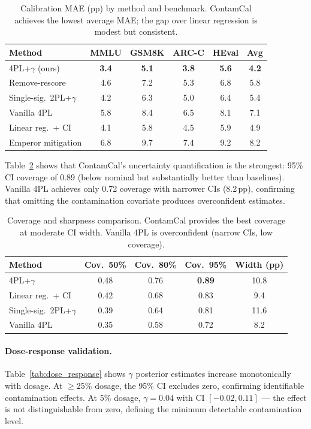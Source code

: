 \documentclass[letterpaper,11pt]{article}
\begin{document}
\begin{table}[t]
\centering
\caption{Calibration MAE (pp) by method and benchmark. ContamCal achieves the lowest average MAE; the gap over linear regression is modest but consistent.}
\label{tab:main_mae}
\small
\begin{tabular}{lccccc}
\toprule
Method & MMLU & GSM8K & ARC-C & HEval & Avg \\
\midrule
4PL+$\gamma$ (ours) & \textbf{3.4} & \textbf{5.1} & \textbf{3.8} & \textbf{5.6} & \textbf{4.2} \\
Remove-rescore & 4.6 & 7.2 & 5.3 & 6.8 & 5.8 \\
Single-sig.\ 2PL+$\gamma$ & 4.2 & 6.3 & 5.0 & 6.4 & 5.4 \\
Vanilla 4PL & 5.8 & 8.4 & 6.5 & 8.1 & 7.1 \\
Linear reg.\ + CI & 4.1 & 5.8 & 4.5 & 5.9 & 4.9 \\
Emperor mitigation & 6.8 & 9.7 & 7.4 & 9.2 & 8.2 \\
\bottomrule
\end{tabular}
\end{table}

Table~\ref{tab:coverage} shows that ContamCal's uncertainty quantification is the strongest: 95\% CI coverage of 0.89 (below nominal but substantially better than baselines). Vanilla 4PL achieves only 0.72 coverage with narrower CIs (8.2\,pp), confirming that omitting the contamination covariate produces overconfident estimates.

\begin{table}[t]
\centering
\caption{Coverage and sharpness comparison. ContamCal provides the best coverage at moderate CI width. Vanilla 4PL is overconfident (narrow CIs, low coverage).}
\label{tab:coverage}
\small
\begin{tabular}{lcccc}
\toprule
Method & Cov.\ 50\% & Cov.\ 80\% & Cov.\ 95\% & Width (pp) \\
\midrule
4PL+$\gamma$ & 0.48 & 0.76 & \textbf{0.89} & 10.8 \\
Linear reg.\ + CI & 0.42 & 0.68 & 0.83 & 9.4 \\
Single-sig.\ 2PL+$\gamma$ & 0.39 & 0.64 & 0.81 & 11.6 \\
Vanilla 4PL & 0.35 & 0.58 & 0.72 & 8.2 \\
\bottomrule
\end{tabular}
\end{table}

\paragraph{Dose-response validation.} Table~\ref{tab:dose_response} shows $\gamma$ posterior estimates increase monotonically with dosage. At $\geq$25\% dosage, the 95\% CI excludes zero, confirming identifiable contamination effects. At 5\% dosage, $\gamma = 0.04$ with CI $[-0.02, 0.11]$ --- the effect is not distinguishable from zero, defining the minimum detectable contamination level.
\end{document}
